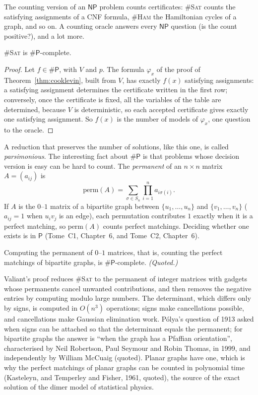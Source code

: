 The counting version of an $\mathsf{NP}$ problem counts certificates: \#\textup{\textsc{Sat}} counts the satisfying assignments of a CNF formula, \#\textup{\textsc{Ham}} the Hamiltonian cycles of a graph, and so on. A counting oracle answers every $\mathsf{NP}$ question (is the count positive?), and a lot more.

\begin{proposition}\label{prop:sharpsat}
\#\textup{\textsc{Sat}} is $\#\mathsf P$-complete.
\end{proposition}

\begin{proof}
Let $f\in\#\mathsf P$, with $V$ and $p$. The formula $\varphi_x$ of the proof of Theorem~\ref{thm:cooklevin}, built from $V$, has exactly $f(x)$ satisfying assignments: a satisfying assignment determines the certificate written in the first row; conversely, once the certificate is fixed, all the variables of the table are determined, because $V$ is deterministic, so each accepted certificate gives exactly one satisfying assignment. So $f(x)$ is the number of models of $\varphi_x$, one question to the oracle.
\end{proof}

A reduction that preserves the number of solutions, like this one, is called \emph{parsimonious}. The interesting fact about $\#\mathsf P$ is that problems whose decision version is easy can be hard to count. The \emph{permanent} of an $n\times n$ matrix $A=(a_{ij})$ is
\[
\mathrm{perm}(A)=\sum_{\sigma\in S_n}\prod_{i=1}^na_{i\sigma(i)}.
\]
If $A$ is the $0$--$1$ matrix of a bipartite graph between $\{u_1,\dots,u_n\}$ and $\{v_1,\dots,v_n\}$ ($a_{ij}=1$ when $u_iv_j$ is an edge), each permutation contributes $1$ exactly when it is a perfect matching, so $\mathrm{perm}(A)$ counts perfect matchings. Deciding whether one exists is in $\mathsf P$ (Tome~C1, Chapter~6, and Tome~C2, Chapter~6).

\begin{theorem}[Valiant 1979]\label{thm:valiant}
Computing the permanent of $0$--$1$ matrices, that is, counting the perfect matchings of bipartite graphs, is $\#\mathsf P$-complete. \emph{(Quoted.)}
\end{theorem}

Valiant's proof reduces \#\textup{\textsc{Sat}} to the permanent of integer matrices with gadgets whose permanents cancel unwanted contributions, and then removes the negative entries by computing modulo large numbers. The determinant, which differs only by signs, is computed in $O(n^3)$ operations; signs make cancellations possible, and cancellations make Gaussian elimination work. Pólya's question of 1913 asked when signs can be attached so that the determinant equals the permanent; for bipartite graphs the answer is ``when the graph has a Pfaffian orientation'', characterised by Neil Robertson, Paul Seymour and Robin Thomas, in 1999, and independently by William McCuaig (quoted). Planar graphs have one, which is why the perfect matchings of planar graphs can be counted in polynomial time (Kasteleyn, and Temperley and Fisher, 1961, quoted), the source of the exact solution of the dimer model of statistical physics.


